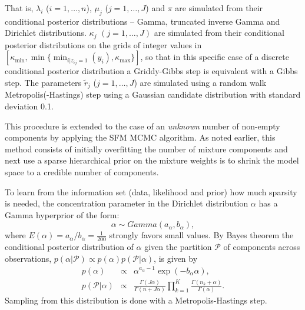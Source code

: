 \documentclass[11pt]{article}
\begin{document}
That is,  $\lambda_i$ ($i=1,\ldots,n$), $\mu_j$ ($j=1,\ldots,J$) and $\pi$ are simulated from their conditional
posterior distributions -- Gamma, truncated inverse Gamma and Dirichlet distributions. $\kappa_j$ $(j=1,\ldots,J)$ are simulated from their conditional posterior distributions on the grids of integer values in $[\kappa_{\mbox{min}}, \min\{  \min_{i|z_{ij}=1}\left(y_i\right), \kappa_{\max} \}]$, so that in this specific case of a discrete conditional posterior distribution a Griddy-Gibbs step is equivalent with a Gibbs step. The parameters $\tilde r_j$ ($j=1,\ldots,J$) are simulated using a random walk Metropolis(-Hastings) step using a Gaussian candidate distribution with standard deviation 0.1.



This procedure is extended to the case of  an \textit{unknown} number of non-empty components by applying the SFM MCMC algorithm. As noted earlier, this method consists of initially overfitting the number of mixture components  and next use a sparse hierarchical prior on the mixture weights is to shrink the model space to a credible number of components.  

To learn from the information set (data, likelihood and prior) how much sparsity is needed, the concentration parameter in the Dirichlet distribution $ \alpha $ has a Gamma hyperprior of the form:
\begin{equation}
	\alpha \sim Gamma(a_{\alpha}, b_{\alpha}),
\end{equation}
where $E(\alpha) = a_{\alpha}/b_{\alpha}=\frac{1}{200}$ strongly favors small values. By Bayes theorem the conditional posterior distribution of $\alpha$ given the partition $\mathcal{P}$ of components across observations, $p( \alpha  |  \mathcal{P} )  \propto p(\alpha) p( \mathcal{P} | \alpha )$, is given by
\begin{eqnarray}
	p(\alpha) & \propto &  \alpha^{ a_{ \alpha} - 1 }  \exp(-b_{ \alpha}  \alpha), \\
	p( \mathcal{P} | \alpha ) & \propto & \frac{ \Gamma( J \alpha ) }{ \Gamma( n + J \alpha) }  
	\prod_{k = 1}^{K} \frac{ \Gamma( n_k + \alpha ) }{ \Gamma(\alpha )}.
\end{eqnarray}
Sampling from this distribution is done with a Metropolis-Hastings step.
\end{document}
